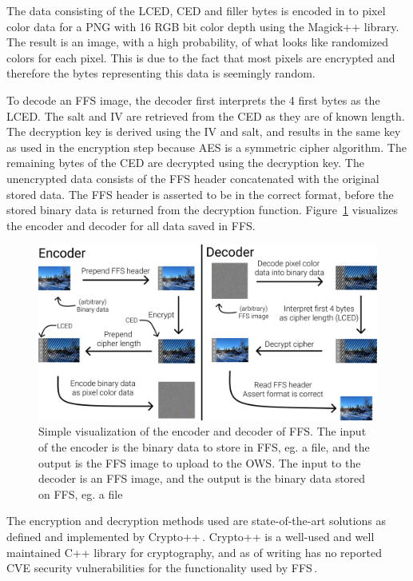 The data consisting of the LCED, CED and filler bytes is encoded in to pixel color data for a PNG with 16 RGB bit color depth using the Magick++ library. The result is an image, with a high probability, of what looks like randomized colors for each pixel. This is due to the fact that most pixels are encrypted and therefore the bytes representing this data is seemingly random.

To decode an FFS image, the decoder first interprets the 4 first bytes as the LCED. The salt and IV are retrieved from the CED as they are of known length. The decryption key is derived using the IV and salt, and results in the same key as used in the encryption step because AES is a symmetric cipher algorithm. The remaining bytes of the CED are decrypted using the decryption key. The unencrypted data consists of the FFS header concatenated with the original stored data. The FFS header is asserted to be in the correct format, before the stored binary data is returned from the decryption function. Figure~\ref{fig:file_enc_dec} visualizes the encoder and decoder for all data saved in FFS.

\begin{figure}[!ht]
	\begin{center}
	  \includegraphics[width=1.0\textwidth]{figures/encoder_decoder.png}
	\end{center}
	\caption[Simple visualization of the encoder and decoder of FFS]{Simple visualization of the encoder and decoder of FFS. The input of the encoder is the binary data to store in FFS, eg. a file, and the output is the FFS image to upload to the OWS. The input to the decoder is an FFS image, and the output is the binary data stored on FFS, eg. a file}
	\label{fig:file_enc_dec}
\end{figure}

The encryption and decryption methods used are state-of-the-art solutions as defined and implemented by Crypto++\,\cite{CryptoLibraryFree}. Crypto++ is a well-used and well maintained C++ library for cryptography, and as of writing has no reported CVE security vulnerabilities for the functionality used by FFS\,\cite{CryptoppSecurityVulnerabilities}.

